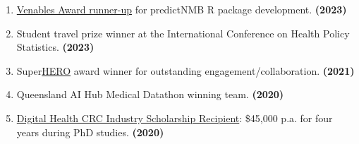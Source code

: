 \begin{enumerate}
	\item \href{https://statsocaus.github.io/venables-award/}{Venables Award runner-up} for {predictNMB} R package development. \hfill\textbf{(2023)}
	\item Student travel prize winner at the International Conference on Health Policy Statistics. \hfill\textbf{(2023)}
	\item Super\href{https://healthequity.link/}{HERO} award winner for outstanding engagement/collaboration. \hfill\textbf{(2021)}
    \item Queensland AI Hub Medical Datathon winning team. \hfill\textbf{(2020)}
	\item \href{https://www.credly.com/badges/ad81135e-f5a0-4f0f-beee-06144ec4d66e/public_url}{Digital Health CRC Industry Scholarship Recipient}: \$45,000 p.a. for four years during PhD studies. \hfill\textbf{(2020)}
\end{enumerate}\par